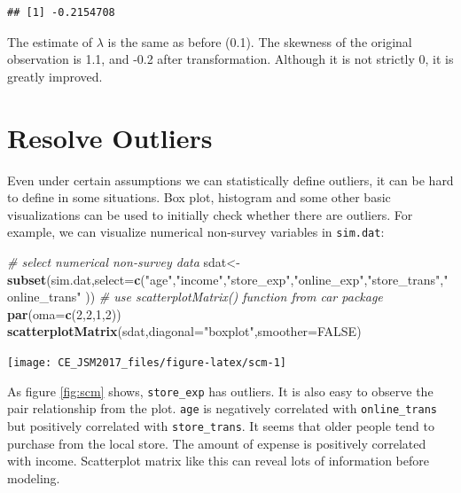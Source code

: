\documentclass[]{book}
\newenvironment{Shaded}{\begin{snugshade}}{\end{snugshade}}
\newcommand{\KeywordTok}[1]{\textcolor[rgb]{0.13,0.29,0.53}{\textbf{{#1}}}}
\newcommand{\DataTypeTok}[1]{\textcolor[rgb]{0.13,0.29,0.53}{{#1}}}
\newcommand{\DecValTok}[1]{\textcolor[rgb]{0.00,0.00,0.81}{{#1}}}
\newcommand{\StringTok}[1]{\textcolor[rgb]{0.31,0.60,0.02}{{#1}}}
\newcommand{\CommentTok}[1]{\textcolor[rgb]{0.56,0.35,0.01}{\textit{{#1}}}}
\newcommand{\OtherTok}[1]{\textcolor[rgb]{0.56,0.35,0.01}{{#1}}}
\newcommand{\NormalTok}[1]{{#1}}
\theoremstyle{definition}
\theoremstyle{definition}
\theoremstyle{remark}
\begin{document}
\begin{verbatim}
## [1] -0.2154708
\end{verbatim}

The estimate of \(\lambda\) is the same as before (0.1). The skewness of
the original observation is 1.1, and -0.2 after transformation. Although
it is not strictly 0, it is greatly improved.

\section{Resolve Outliers}\label{resolve-outliers}

Even under certain assumptions we can statistically define outliers, it
can be hard to define in some situations. Box plot, histogram and some
other basic visualizations can be used to initially check whether there
are outliers. For example, we can visualize numerical non-survey
variables in \texttt{sim.dat}:

\begin{Shaded}
\begin{Highlighting}[]
\CommentTok{# select numerical non-survey data}
\NormalTok{sdat<-}\KeywordTok{subset}\NormalTok{(sim.dat,}\DataTypeTok{select=}\KeywordTok{c}\NormalTok{(}\StringTok{"age"}\NormalTok{,}\StringTok{"income"}\NormalTok{,}\StringTok{"store_exp"}\NormalTok{,}\StringTok{"online_exp"}\NormalTok{,}\StringTok{"store_trans"}\NormalTok{,}\StringTok{"online_trans"} \NormalTok{))}
\CommentTok{# use scatterplotMatrix() function from car package}
\KeywordTok{par}\NormalTok{(}\DataTypeTok{oma=}\KeywordTok{c}\NormalTok{(}\DecValTok{2}\NormalTok{,}\DecValTok{2}\NormalTok{,}\DecValTok{1}\NormalTok{,}\DecValTok{2}\NormalTok{))}
\KeywordTok{scatterplotMatrix}\NormalTok{(sdat,}\DataTypeTok{diagonal=}\StringTok{"boxplot"}\NormalTok{,}\DataTypeTok{smoother=}\OtherTok{FALSE}\NormalTok{)}
\end{Highlighting}
\end{Shaded}

\begin{center}\texttt{[image: CE\_JSM2017\_files/figure-latex/scm-1]} \end{center}

As figure \ref{fig:scm} shows, \texttt{store\_exp} has outliers. It is
also easy to observe the pair relationship from the plot. \texttt{age}
is negatively correlated with \texttt{online\_trans} but positively
correlated with \texttt{store\_trans}. It seems that older people tend
to purchase from the local store. The amount of expense is positively
correlated with income. Scatterplot matrix like this can reveal lots of
information before modeling.
\end{document}
